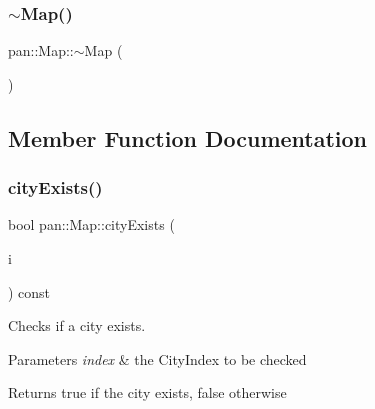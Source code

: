 \mbox{\label{classpan_1_1_map_a91d7bff34d75bc416ec7e6bdc4a497ab}} 
\subsubsection{\texorpdfstring{$\sim$\+Map()}{~Map()}}
{\footnotesize\ttfamily pan\+::\+Map\+::$\sim$\+Map (\begin{DoxyParamCaption}{ }\end{DoxyParamCaption})\hspace{0.3cm}{\ttfamily [default]}}



\subsection{Member Function Documentation}
\mbox{\label{classpan_1_1_map_a331d27d9fe199aea61b6ed76b4950d55}} 
\subsubsection{\texorpdfstring{city\+Exists()}{cityExists()}}
{\footnotesize\ttfamily bool pan\+::\+Map\+::city\+Exists (\begin{DoxyParamCaption}\item[{\hyperlink{namespacepan_afaed28aa6603153dcc062a028602d697}{City\+Index}}]{i }\end{DoxyParamCaption}) const\hspace{0.3cm}{\ttfamily [inline]}}

Checks if a city exists. 
\begin{DoxyParams}{Parameters}
{\em index} & the City\+Index to be checked \\
\hline
\end{DoxyParams}
\begin{DoxyReturn}{Returns}
true if the city exists, false otherwise 
\end{DoxyReturn}
\mbox{\label{classpan_1_1_map_a1cb8308c1ddac316a683be688277a25a}} 

